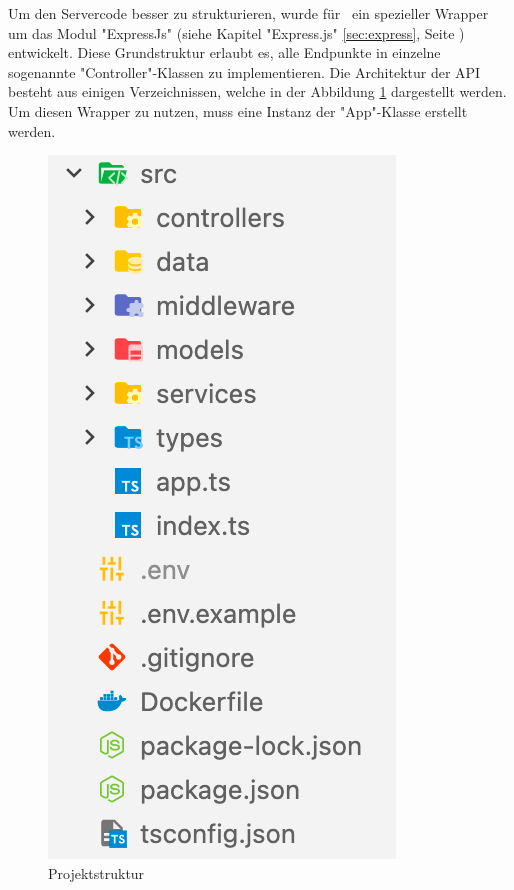 
Um den Servercode besser zu strukturieren, wurde für \ZELIA\ ein spezieller Wrapper um das Modul "ExpressJs" (siehe Kapitel "Express.js" \ref{sec:express}, Seite \pageref{sec:express}) entwickelt. 
Diese Grundstruktur erlaubt es, alle Endpunkte in einzelne sogenannte "Controller"-Klassen zu implementieren. 
Die Architektur der API besteht aus einigen Verzeichnissen, welche in der Abbildung \ref{fig:apiStructure} dargestellt werden. 
Um diesen Wrapper zu nutzen, muss eine Instanz der "App"-Klasse erstellt werden.

\begin{figure}[H]
    \centering
    \includegraphics{media/APITemplate/ProjectStructure.png}
    \caption{Projektstruktur}
    \label{fig:apiStructure}
\end{figure}

\clearpage









